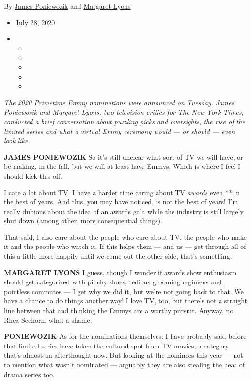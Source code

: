 By \href{https://www.nytimes3xbfgragh.onion/by/james-poniewozik}{James
Poniewozik} and
\href{https://www.nytimes3xbfgragh.onion/by/margaret-lyons}{Margaret
Lyons}

\begin{itemize}
\item
  July 28, 2020
\item
  \begin{itemize}
  \item
  \item
  \item
  \item
  \item
  \end{itemize}
\end{itemize}

\emph{The 2020 Primetime Emmy nominations were announced on Tuesday.
James Poniewozik and Margaret Lyons, two television critics for The New
York Times, conducted a brief conversation about puzzling picks and
oversights, the rise of the limited series and what a virtual Emmy
ceremony would --- or should --- even look like.}

\textbf{JAMES PONIEWOZIK} So it's still unclear what sort of TV we will
have, or be making, in the fall, but we will at least have Emmys. Which
is where I feel I should kick this off.

I care a lot about TV. I have a harder time caring about TV
\emph{awards} even ** in the best of years. And this, you may have
noticed, is not the best of years! I'm really dubious about the idea of
an awards gala while the industry is still largely shut down (among
other, more consequential things).

That said, I also care about the people who care about TV, the people
who make it and the people who watch it. If this helps them --- and us
--- get through all of this a little more happily until we come out the
other side, that's something.

\textbf{MARGARET LYONS} I guess, though I wonder if awards show
enthusiasm should get categorized with pinchy shoes, tedious grooming
regimens and pointless commutes --- I get why we did it, but we're not
going back to that. We have a chance to do things another way! I love
TV, too, but there's not a straight line between that and thinking the
Emmys are a worthy pursuit. Anyway, no Rhea Seehorn, what a shame.

\textbf{PONIEWOZIK} As for the nominations themselves: I have probably
said before that limited series have taken the cultural spot from TV
movies, a category that's almost an afterthought now. But looking at the
nominees this year --- not to mention what
\href{https://www.nytimes3xbfgragh.onion/2020/04/28/arts/television/normal-people-review.html}{wasn't}
\href{https://www.nytimes3xbfgragh.onion/2019/09/13/arts/television/review-netflix-unbelievable.html}{nominated}
--- arguably they are also stealing the heat of drama series too.

